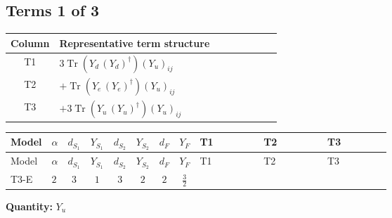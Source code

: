 \documentclass[8pt]{article}
\begin{document}
\begin{landscape}
\subsection*{Terms 1 of 3}
\begin{center}
\begin{tabular}{@{}c >{\raggedright\arraybackslash}p{0.82\linewidth}@{}}
\toprule
Column & Representative term structure \\
\midrule
T1 & \(\displaystyle 3 \operatorname{Tr}\!\left({Y_d}\,\left({Y_d}\right)^{\dagger}\right) \left({Y_u}\right)_{ij}\) \\
\midrule
T2 & \(\displaystyle +\operatorname{Tr}\!\left({Y_e}\,\left({Y_e}\right)^{\dagger}\right) \left({Y_u}\right)_{ij}\) \\
\midrule
T3 & \(\displaystyle +3 \operatorname{Tr}\!\left({Y_u}\,\left({Y_u}\right)^{\dagger}\right) \left({Y_u}\right)_{ij}\) \\
\midrule
\bottomrule
\end{tabular}
\end{center}
\smallskip
\tiny
\begin{longtable}{@{}llcccccc >{\raggedright\arraybackslash}p{0.21\linewidth} >{\raggedright\arraybackslash}p{0.21\linewidth} >{\raggedright\arraybackslash}p{0.21\linewidth}@{}}
\toprule
Model & $\alpha$ & $d_{S_1}$ & $Y_{S_1}$ & $d_{S_2}$ & $Y_{S_2}$ & $d_F$ & $Y_F$ & T1 & T2 & T3 \\
\midrule
\endfirsthead
\toprule
Model & $\alpha$ & $d_{S_1}$ & $Y_{S_1}$ & $d_{S_2}$ & $Y_{S_2}$ & $d_F$ & $Y_F$ & T1 & T2 & T3 \\
\midrule
\endhead
T3-E & $2$ & $3$ & $1$ & $3$ & $2$ & $2$ & $\frac{3}{2}$ & \scriptsize\adjustbox{max width=\linewidth}{$\begin{gathered} 3 \operatorname{Tr}\!\left({Y_d}\,\left({Y_d}\right)^{\dagger}\right) \left({Y_u}\right)_{ij}\end{gathered}$} & \scriptsize\adjustbox{max width=\linewidth}{$\begin{gathered} +\operatorname{Tr}\!\left({Y_e}\,\left({Y_e}\right)^{\dagger}\right) \left({Y_u}\right)_{ij}\end{gathered}$} & \scriptsize\adjustbox{max width=\linewidth}{$\begin{gathered} +3 \operatorname{Tr}\!\left({Y_u}\,\left({Y_u}\right)^{\dagger}\right) \left({Y_u}\right)_{ij}\end{gathered}$} \\
\midrule
\bottomrule
\end{longtable}
\clearpage
\noindent\textbf{Quantity: }$Y_u$\par\smallskip

\end{landscape}
\end{document}

